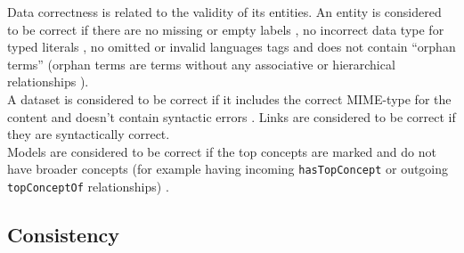 \documentclass[onecolumn, crcready]{iosart2c}
\begin{document}
Data correctness is related to the validity of its entities. An entity is considered to be correct if there are no missing or empty labels \cite{Acosta2013}\cite{Mader2012}, no incorrect data type for typed literals \cite{Hogan2010}\cite{Acosta2013}, no omitted or invalid languages tags \cite{Suominen:2012:IQS:2413941.2413985}\cite{Mader2012} and does not contain ``orphan terms'' (orphan terms are terms without any associative or hierarchical relationships \cite{journals/ires/Living10}).\\
A dataset is considered to be correct if it includes the correct MIME-type for the content \cite{Hogan2010} and doesn't contain syntactic errors \cite{Hogan2010}.
Links are considered to be correct if they are syntactically correct.\\
Models are considered to be correct if the top concepts are marked and do not have broader concepts (for example having incoming \texttt{hasTopConcept} or outgoing \texttt{topConceptOf} relationships) \cite{Mader2012}.



\subsection{Consistency}
\end{document}
